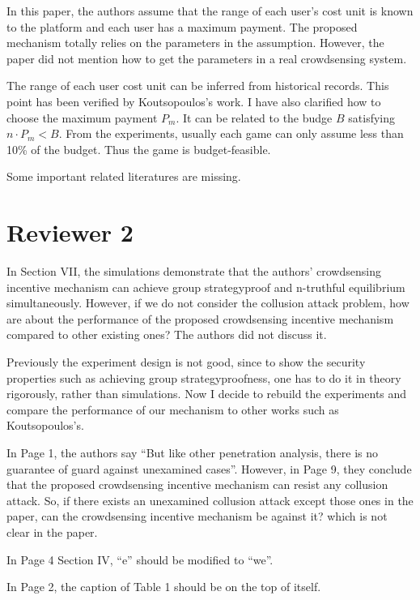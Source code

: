 \documentclass[a4paper,11pt]{exam}
\begin{document}
\begin{questions}
\question In this paper, the authors assume that the range of each user’s cost unit is known to the platform and each user has a maximum payment. The proposed mechanism totally relies on the parameters in the assumption. However, the paper did not mention how to get the parameters in a real crowdsensing system.
\begin{solution}
The range of each user cost unit can be inferred from historical records. This point has been verified by Koutsopoulos's work. I have also clarified how to choose the maximum payment $P_m$. It can be related to the budge $B$ satisfying $n\cdot P_m < B$. From the experiments, usually each game can only assume less than 10\% of the budget. Thus the game is budget-feasible. 
\end{solution}

\question Some important related literatures are missing.

\section{Reviewer 2}
\question In Section VII, the simulations demonstrate that the authors’ crowdsensing incentive mechanism can achieve group strategyproof and n-truthful equilibrium simultaneously. However, if we do not consider the collusion attack problem, how are about the performance of the proposed crowdsensing incentive mechanism compared to other existing ones? The authors did not discuss it.  
\begin{solution}
Previously the experiment design is not good, since to show the security properties such as achieving group strategyproofness, one has to do it in theory rigorously, rather than simulations. Now I decide to rebuild the experiments and compare the performance of our mechanism to other works such as Koutsopoulos's.
\end{solution}

\question In Page 1, the authors say “But like other penetration analysis, there is no guarantee of guard against unexamined cases”. However, in Page 9, they conclude that the proposed crowdsensing incentive mechanism can resist any collusion attack. So, if there exists an unexamined collusion attack except those ones in the paper, can the  crowdsensing incentive mechanism be against it?  which is not clear in the paper.

\question In Page 4 Section IV, “e” should be modified to “we”.

\question In Page 2, the caption of Table 1  should be on the top of itself.


\end{questions}
\end{document}
